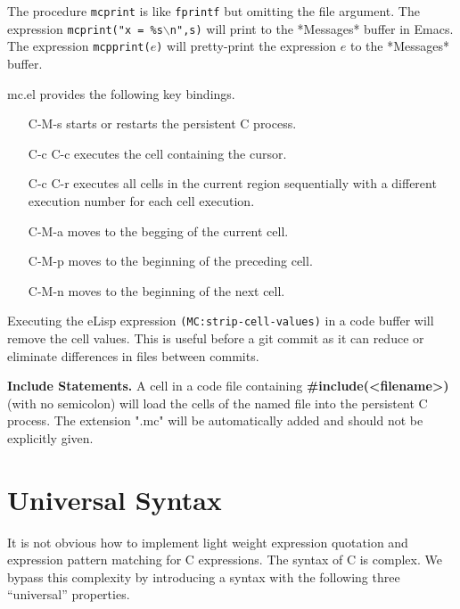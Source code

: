 \documentclass{article}
\begin{document}
 The procedure {\tt mcprint} is like {\tt fprintf} but omitting the file argument. The expression
{\tt mcprint("x = \%s$\backslash$n",s)} will print to the *Messages* buffer in Emacs. The expression {\tt mcpprint($e$)}
will pretty-print the expression $e$ to the *Messages* buffer.

  mc.el provides the following key bindings.

\begin{itemize}
\item[C-M-s] starts or restarts the persistent C process.

\item[C-c C-c] executes the cell containing the cursor.
  
\item[C-c C-r] executes all cells in the current region sequentially with a different execution number for each cell execution.

\item[C-M-a] moves to the begging of the current cell.

\item[C-M-p] moves to the beginning of the preceding cell.

\item[C-M-n] moves to the beginning of the next cell.

\end{itemize}

Executing the eLisp expression {\tt (MC:strip-cell-values)} in a code buffer will remove the cell values.  This is useful before a git commit as it can reduce or eliminate differences
in files between commits.

{\bf Include Statements.}  A cell in a code file containing {\bf #include(<filename>)} (with no semicolon) will load the cells of the named
file into the persistent C process.  The extension ".mc" will be automatically added and should not be explicitly given.

\section{Universal Syntax}

It is not obvious how to implement light weight expression quotation and expression pattern matching for C expressions.  The syntax of C is complex.
We bypass this complexity by introducing a syntax with the following three ``universal'' properties.
\end{document}
